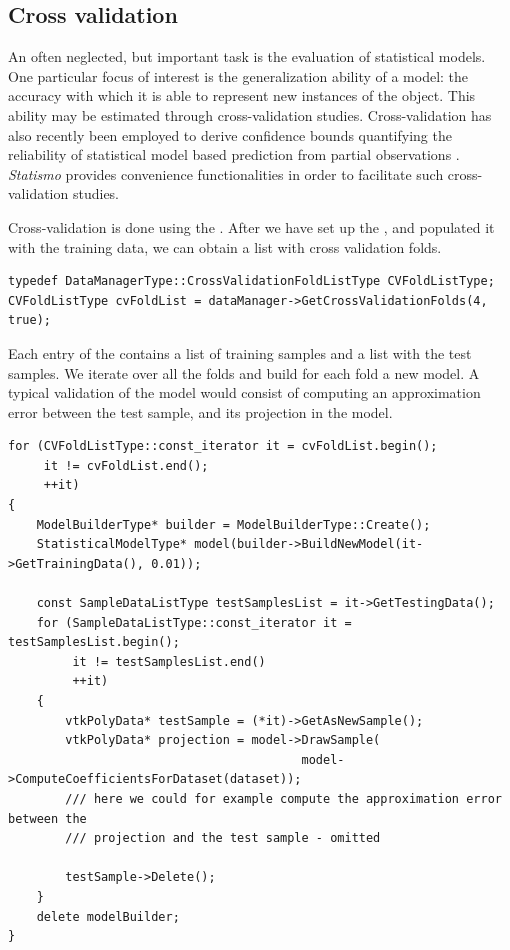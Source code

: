 \documentclass{InsightArticle}
\newcommand{\Statismo}{\emph{Statismo}\xspace}
\begin{document}
\subsection{Cross validation}
An often neglected, but important task is the evaluation of
statistical models. One particular focus of interest is the
generalization ability of a model: the accuracy with which it is able to represent new instances of the object. 
This ability may be estimated through cross-validation studies. Cross-validation has also recently been employed
to derive confidence bounds quantifying the reliability of statistical model based prediction from partial observations \cite{blanc_estimating_2009,blanc_confidence_2012}. \Statismo provides convenience functionalities in order to facilitate such cross-validation studies. 

Cross-validation is done using the . 
After we have set up the , and populated it with the training data, we 
can obtain a list with cross validation folds. 
\begin{verbatim}
typedef DataManagerType::CrossValidationFoldListType CVFoldListType;
CVFoldListType cvFoldList = dataManager->GetCrossValidationFolds(4, true);
\end{verbatim}
Each entry of the  contains a list of training samples and a list with the test samples. 
We iterate over all the folds and build for each fold a new model. A typical validation of the model would 
consist of computing an approximation error between the test sample, and its projection in the model. 
\begin{verbatim}
for (CVFoldListType::const_iterator it = cvFoldList.begin();
     it != cvFoldList.end();
     ++it)
{
    ModelBuilderType* builder = ModelBuilderType::Create();
    StatisticalModelType* model(builder->BuildNewModel(it->GetTrainingData(), 0.01));

    const SampleDataListType testSamplesList = it->GetTestingData();
    for (SampleDataListType::const_iterator it = testSamplesList.begin();
         it != testSamplesList.end()
         ++it)
    {
        vtkPolyData* testSample = (*it)->GetAsNewSample();
        vtkPolyData* projection = model->DrawSample(
                                         model->ComputeCoefficientsForDataset(dataset));
        /// here we could for example compute the approximation error between the 
        /// projection and the test sample - omitted

        testSample->Delete();
    }
    delete modelBuilder;
}

\end{verbatim}
\end{document}
